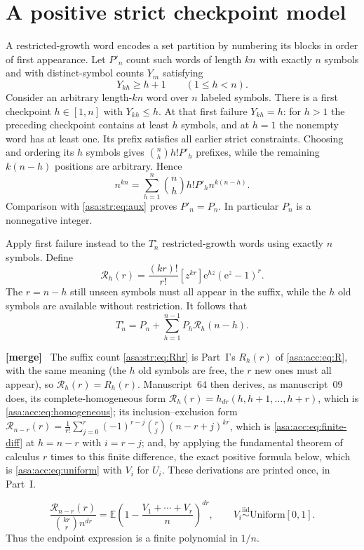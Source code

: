 \documentclass[11pt,letterpaper]{article}
\theoremstyle{remark}\newtheorem{remark}[theorem]{Remark}
\numberwithin{equation}{section}
\newcommand{\E}{\mathbb E}\newcommand{\Prob}{\mathbb P}\newcommand{\Prb}{\mathbb P}
\newcommand{\ee}{\mathrm e}
\newenvironment{mergenote}{\par\smallskip\begingroup\small
 \noindent\textbf{[merge]}\ }{\par\endgroup\smallskip}
\begin{document}
\section{A positive strict checkpoint model}\label{asa:str:sec:positive}
A restricted-growth word encodes a set partition by numbering its blocks in order of first appearance. Let $P'_n$ count such words of length $kn$ with exactly $n$ symbols and with distinct-symbol counts $Y_m$ satisfying
\begin{equation}\label{asa:str:eq:strict}
 Y_{kh}\ge h+1\qquad(1\le h<n).
\end{equation}
Consider an arbitrary length-$kn$ word over $n$ labeled symbols. There is a first checkpoint $h\in[1,n]$ with $Y_{kh}\le h$. At that first failure $Y_{kh}=h$: for $h>1$ the preceding checkpoint contains at least $h$ symbols, and at $h=1$ the nonempty word has at least one. Its prefix satisfies all earlier strict constraints. Choosing and ordering its $h$ symbols gives $\binom nh h!P'_h$ prefixes, while the remaining $k(n-h)$ positions are arbitrary. Hence
\[
 n^{kn}=\sum_{h=1}^n\binom nh h!P'_h n^{k(n-h)}.
\]
Comparison with \eqref{asa:str:eq:aux} proves $P'_n=P_n$. In particular $P_n$ is a nonnegative integer.

Apply first failure instead to the $T^{\circ}_n$ restricted-growth words using exactly $n$ symbols. Define
\begin{equation}\label{asa:str:eq:Rhr}
 \mathcal R_h(r)=\frac{(kr)!}{r!}[z^{kr}]\ee^{hz}(\ee^z-1)^r.
\end{equation}
The $r=n-h$ still unseen symbols must all appear in the suffix, while the $h$ old symbols are available without restriction. It follows that
\begin{equation}\label{asa:str:eq:renewal}
 T^{\circ}_n=P_n+\sum_{h=1}^{n-1}P_h\mathcal R_h(n-h).
\end{equation}
\begin{mergenote}
The suffix count \eqref{asa:str:eq:Rhr} is Part~I's $R_h(r)$ of
\eqref{asa:acc:eq:R}, with the same meaning (the $h$ old symbols are free,
the $r$ new ones must all appear), so $\mathcal R_h(r)=R_h(r)$. Manuscript~64
then derives, as manuscript~09 does, its complete-homogeneous form
$\mathcal R_h(r)=h_{dr}(h,h+1,\ldots,h+r)$, which is
\eqref{asa:acc:eq:homogeneous}; its inclusion--exclusion form
$\mathcal R_{n-r}(r)=\frac1{r!}\sum_{j=0}^r(-1)^{r-j}\binom rj(n-r+j)^{kr}$,
which is \eqref{asa:acc:eq:finite-diff} at $h=n-r$ with $i=r-j$; and, by
applying the fundamental theorem of calculus $r$ times to this finite
difference, the exact positive formula below, which is
\eqref{asa:acc:eq:uniform} with $V_i$ for $U_i$. These derivations are
printed once, in Part~I.
\end{mergenote}
\begin{equation}\label{asa:str:eq:uniform}
 \frac{\mathcal R_{n-r}(r)}{\binom{kr}r n^{dr}}
 =\E\left(1-\frac{V_1+\cdots+V_r}{n}\right)^{dr},
 \qquad V_i\overset{\mathrm{iid}}\sim\mathrm{Uniform}[0,1].
\end{equation}
Thus the endpoint expression is a finite polynomial in $1/n$.
\end{document}

